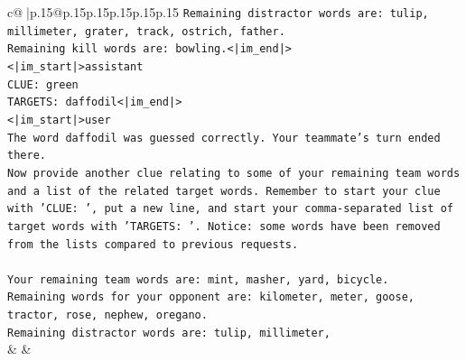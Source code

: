 \documentclass{article}
\begin{document}
{\begin{supertabular}{c@{$\;$}|p{.15\linewidth}@{}p{.15\linewidth}p{.15\linewidth}p{.15\linewidth}p{.15\linewidth}p{.15\linewidth}}
{{{\texttt{Remaining distractor words are: tulip, millimeter, grater, track, ostrich, father.} \\
\texttt{Remaining kill words are: bowling.<|im\_end|>} \\
\texttt{<|im\_start|>assistant} \\
\texttt{CLUE: green} \\
\texttt{TARGETS: daffodil<|im\_end|>} \\
\texttt{<|im\_start|>user} \\
\texttt{The word daffodil was guessed correctly. Your teammate's turn ended there.} \\
\texttt{Now provide another clue relating to some of your remaining team words and a list of the related target words. Remember to start your clue with 'CLUE: ', put a new line, and start your comma{-}separated list of target words with 'TARGETS: '. Notice: some words have been removed from the lists compared to previous requests.} \\
\\ 
\texttt{Your remaining team words are: mint, masher, yard, bicycle.} \\
\texttt{Remaining words for your opponent are: kilometer, meter, goose, tractor, rose, nephew, oregano.} \\
\texttt{Remaining distractor words are: tulip, millimeter,} \\
            }
        }
    }
    & & \\ \\


\end{supertabular}}
\end{document}
